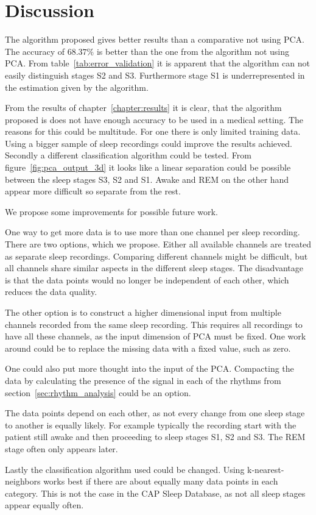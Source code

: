 \chapter{Discussion}
\label{chapter:discussion}

The algorithm proposed gives better results than a comparative not using PCA. The accuracy of $68.37\%$ is better than the one from the algorithm not using PCA. From table~\ref{tab:error_validation} it is apparent that the algorithm can not easily distinguish stages S2 and S3. Furthermore stage S1 is underrepresented in the estimation given by the algorithm.

From the results of chapter~\ref{chapter:results} it is clear, that the algorithm proposed is does not have enough accuracy to be used in a medical setting. The reasons for this could be multitude. For one there is only limited training data. Using a bigger sample of sleep recordings could improve the results achieved. Secondly a different classification algorithm could be tested. From figure~\ref{fig:pca_output_3d} it looks like a linear separation could be possible between the sleep stages S3, S2 and S1. Awake and REM on the other hand appear more difficult so separate from the rest.

We propose some improvements for possible future work.

One way to get more data is to use more than one channel per sleep recording. There are two options, which we propose. Either all available channels are treated as separate sleep recordings. Comparing different channels might be difficult, but all channels share similar aspects in the different sleep stages. The disadvantage is that the data points would no longer be independent of each other, which reduces the data quality.

The other option is to construct a higher dimensional input from multiple channels recorded from the same sleep recording. This requires all recordings to have all these channels, as the input dimension of PCA must be fixed. One work around could be to replace the missing data with a fixed value, such as zero.

One could also put more thought into the input of the PCA. Compacting the data by calculating the presence of the signal in each of the rhythms from section~\ref{sec:rhythm_analysis} could be an option.

The data points depend on each other, as not every change from one sleep stage to another is equally likely. For example typically the recording start with the patient still awake and then proceeding to sleep stages S1, S2 and S3. The REM stage often only appears later.

Lastly the classification algorithm used could be changed. Using k-nearest-neighbors works best if there are about equally many data points in each category. This is not the case in the CAP Sleep Database, as not all sleep stages appear equally often.